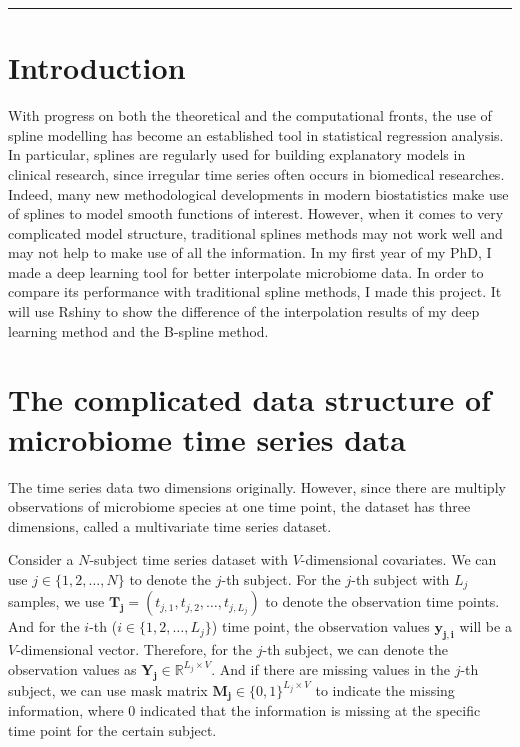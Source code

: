 \documentclass[a4 paper]{article}
\begin{document}


\rule{\textwidth}{0.1pt}

\tableofcontents


\section{Introduction}
With progress on both the theoretical and the computational fronts, the use of spline modelling has become an established tool in statistical regression analysis. In particular, splines are regularly used for building explanatory models in clinical research, since irregular time series often occurs in biomedical researches\cite{coenen2020primer}. Indeed, many new methodological developments in modern biostatistics make use of splines to model smooth functions of interest. However, when it comes to very complicated model structure, traditional splines methods may not work well and may not help to make use of all the information. In my first year of my PhD, I made a deep learning tool for better interpolate microbiome data. In order to compare its performance with traditional spline methods, I made this project. It will use Rshiny to show the difference of the interpolation results of my deep learning method and the B-spline method.

\section{The complicated data structure of microbiome time series data}

The time series data two dimensions originally. However, since there are multiply observations of microbiome species at one time point, the dataset has three dimensions, called a multivariate time series dataset.

Consider a $N$-subject time series dataset with $V$-dimensional covariates. We can use $j \in \{1,2,\ldots,N \}$ to denote the $j$-th subject. For the $j$-th subject with $L_j$ samples, we use $\mathbf{T_j} = (t_{j,1}, t_{j,2}, \ldots, t_{j,L_j})$ to denote the observation time points. And for the $i$-th ($i \in\{1,2, \ldots, L_j\}$) time point, the observation values $\mathbf{y_{j,i}}$ will be a $V$-dimensional vector. Therefore, for the $j$-th subject, we can denote the observation values as $\mathbf{Y_j}\in \mathbb{R}^{L_{j}\times V}$. And if there are missing values in the $j$-th subject, we can use mask matrix $\mathbf{M_j}\in\{0,1\}^{L_{j}\times V}$ to indicate the missing information, where 0 indicated that the information is missing at the specific time point for the certain subject.
\end{document}
